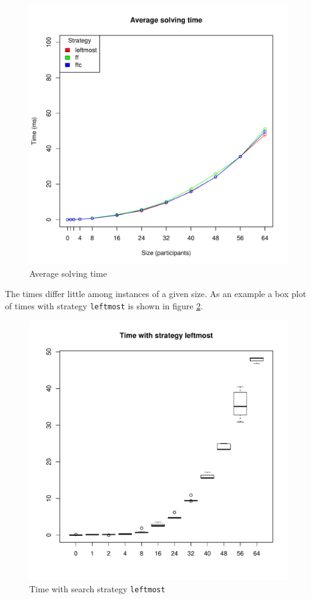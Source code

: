 \documentclass{article}
\newcommand{\code}[1]{\texttt{#1}}
\begin{document}
\begin{figure}
\centering
\includegraphics[width=\linewidth]{time}
\caption{Average solving time}
\label{fig:time}
\end{figure}

The times differ little among instances of a given size.
As an example a box plot of times with strategy \code{leftmost} is shown
in figure \ref{fig:leftmost-time}.

\begin{figure}
\centering
\includegraphics[width=\linewidth]{leftmost_time}
\caption{Time with search strategy \code{leftmost}}
\label{fig:leftmost-time}
\end{figure}
\end{document}
